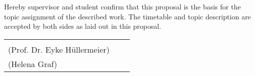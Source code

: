 \documentclass[12pt]{scrartcl}
\begin{document}


\newpage
\printbibliography

\newpage
Hereby supervisor and student confirm that this proposal is the basis for the topic assignment of the described work. The timetable and topic description are accepted by both sides as laid out in this proposal.

\vspace{6cm}

\begin{center}
     \begin{tabular}{l p{} r}
       \cline{1-1} \cline{3-3}
       \begin{minipage}[t]{0.4\textwidth}
         \centering
         Supervisor\\(Prof. Dr. Eyke H\"ullermeier)
         \end{minipage}
&
         \begin{minipage}[t]{0.2\textwidth}
         \end{minipage}
&
         \begin{minipage}[t]{0.4\textwidth}
           \centering
           Student\\(Helena Graf)
         \end{minipage}
     \end{tabular}
\end{center}
\end{document}
